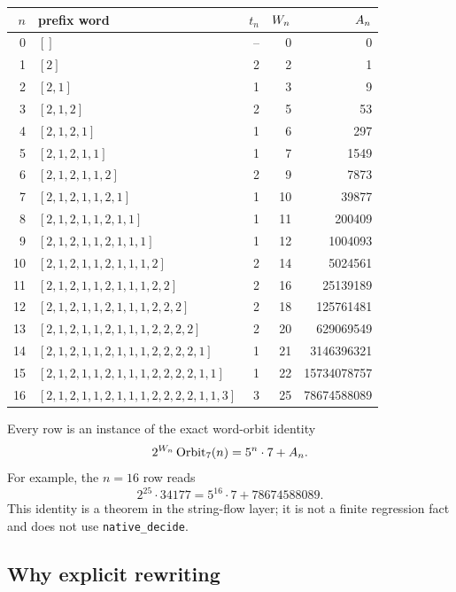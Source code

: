 \begin{center}
\scriptsize
\begin{tabular}{@{}rlrrr@{}}
\toprule
$n$ & prefix word & $t_n$ & $W_n$ & $A_n$ \\
\midrule
0 & $[]$ & -- & 0 & 0 \\
1 & $[2]$ & 2 & 2 & 1 \\
2 & $[2,1]$ & 1 & 3 & 9 \\
3 & $[2,1,2]$ & 2 & 5 & 53 \\
4 & $[2,1,2,1]$ & 1 & 6 & 297 \\
5 & $[2,1,2,1,1]$ & 1 & 7 & 1549 \\
6 & $[2,1,2,1,1,2]$ & 2 & 9 & 7873 \\
7 & $[2,1,2,1,1,2,1]$ & 1 & 10 & 39877 \\
8 & $[2,1,2,1,1,2,1,1]$ & 1 & 11 & 200409 \\
9 & $[2,1,2,1,1,2,1,1,1]$ & 1 & 12 & 1004093 \\
10 & $[2,1,2,1,1,2,1,1,1,2]$ & 2 & 14 & 5024561 \\
11 & $[2,1,2,1,1,2,1,1,1,2,2]$ & 2 & 16 & 25139189 \\
12 & $[2,1,2,1,1,2,1,1,1,2,2,2]$ & 2 & 18 & 125761481 \\
13 & $[2,1,2,1,1,2,1,1,1,2,2,2,2]$ & 2 & 20 & 629069549 \\
14 & $[2,1,2,1,1,2,1,1,1,2,2,2,2,1]$ & 1 & 21 & 3146396321 \\
15 & $[2,1,2,1,1,2,1,1,1,2,2,2,2,1,1]$ & 1 & 22 & 15734078757 \\
16 & $[2,1,2,1,1,2,1,1,1,2,2,2,2,1,1,3]$ & 3 & 25 & 78674588089 \\
\bottomrule
\end{tabular}
\end{center}

Every row is an instance of the exact word-orbit identity
\begin{equation*}
  2^{W_n}\,\mathrm{Orbit}_7(n)=5^n\cdot7+A_n.
\end{equation*}
For example, the $n=16$ row reads
\begin{equation*}
  2^{25}\cdot34177=5^{16}\cdot7+78674588089.
\end{equation*}
This identity is a theorem in the string-flow layer; it is not a
finite regression fact and does not use \texttt{native\_decide}.

\subsection{Why explicit rewriting}

